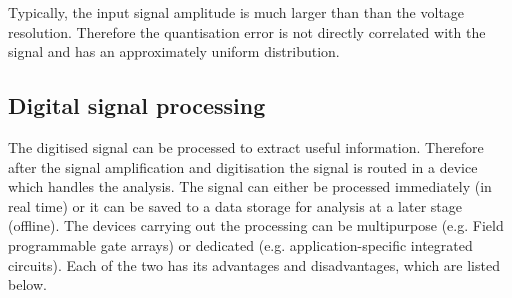 \documentclass[12pt]{mytustyle}  %
\begin{document}
Typically, the input signal amplitude is much larger than than the voltage resolution. Therefore the quantisation error is not directly correlated with the signal and has an approximately uniform distribution. 


\subsection{Digital signal processing}
The digitised signal can be processed to extract useful information. Therefore after the signal amplification and digitisation the signal is routed in a device which handles the analysis. The signal can either be processed immediately (in real time) or it can be saved to a data storage for analysis at a later stage (offline). The devices carrying out the processing can be multipurpose (e.g. Field programmable gate arrays) or dedicated (e.g. application-specific integrated circuits). Each of the two has its advantages and disadvantages, which are listed below. 
\end{document}
